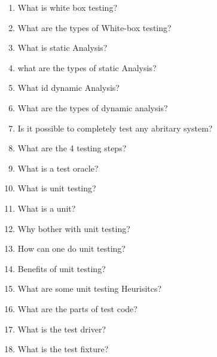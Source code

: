 \documentclass[10pt]{article}
\begin{document}
\begin{enumerate}
    \item What is white box testing?\\

    \item What are the types of White-box testing?

    \item What is static Analysis?\\

    \item what are the types of static Analysis?\\
    \item What id dynamic Analysis?\\

    \item What are the types of dynamic analysis?\\

    \item Is it possible to completely test any abritary system?\\


    \item What are the 4 testing steps?\\


    \item What is a test oracle?\\

    \item What is unit testing?\\

    \item What is a unit?

    \item Why bother with unit testing?\\

    \item How can one do unit testing?\\

    \item Benefits of unit testing?

    \item What are some unit testing Heurisitcs?\\

    \item What are the parts of test code?
    \item What is the test driver?\\

    \item What is the test fixture?\\


\end{enumerate}
\end{document}

